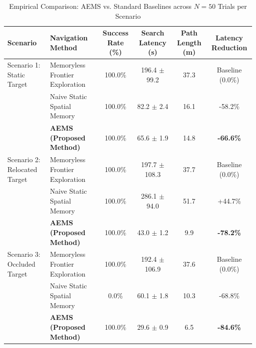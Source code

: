 \begin{table}[t]
\centering
\caption{Empirical Comparison: AEMS vs. Standard Baselines across $N=50$ Trials per Scenario}
\label{tab:baseline_comparison}
\begin{tabular}{llcccc}
\hline
\textbf{Scenario} & \textbf{Navigation Method} & \textbf{Success Rate (\%)} & \textbf{Search Latency (s)} & \textbf{Path Length (m)} & \textbf{Latency Reduction} \\
\hline
Scenario 1: Static Target & Memoryless Frontier Exploration & 100.0\% & 196.4 $\pm$ 99.2 & 37.3 & Baseline (0.0\%) \\
 & Naive Static Spatial Memory & 100.0\% & 82.2 $\pm$ 2.4 & 16.1 & -58.2\% \\
 & \textbf{AEMS (Proposed Method)} & 100.0\% & 65.6 $\pm$ 1.9 & 14.8 & \textbf{-66.6\%} \\
\hline
Scenario 2: Relocated Target & Memoryless Frontier Exploration & 100.0\% & 197.7 $\pm$ 108.3 & 37.7 & Baseline (0.0\%) \\
 & Naive Static Spatial Memory & 100.0\% & 286.1 $\pm$ 94.0 & 51.7 & +44.7\% \\
 & \textbf{AEMS (Proposed Method)} & 100.0\% & 43.0 $\pm$ 1.2 & 9.9 & \textbf{-78.2\%} \\
\hline
Scenario 3: Occluded Target & Memoryless Frontier Exploration & 100.0\% & 192.4 $\pm$ 106.9 & 37.6 & Baseline (0.0\%) \\
 & Naive Static Spatial Memory & 0.0\% & 60.1 $\pm$ 1.8 & 10.3 & -68.8\% \\
 & \textbf{AEMS (Proposed Method)} & 100.0\% & 29.6 $\pm$ 0.9 & 6.5 & \textbf{-84.6\%} \\
\hline
\end{tabular}
\end{table}
